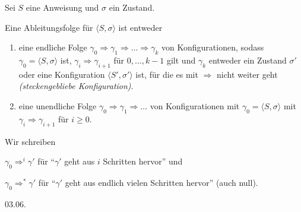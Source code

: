 \begin{definition}
    Sei $S$ eine Anweisung und $\sigma$ ein Zustand.

    Eine Ableitungsfolge für $\langle S, \sigma \rangle$ ist entweder
    \begin{enumerate}
        \item eine endliche Folge $\gamma_0 \Rightarrow \gamma_1 \Rightarrow \dots \Rightarrow \gamma_k$ von Konfigurationen, sodass $\gamma_0 = \langle S, \sigma \rangle$ ist, $\gamma_i \Rightarrow \gamma_{i+1}$ für $0, \dots, k-1$ gilt und $\gamma_k$ entweder ein Zustand $\sigma'$ oder eine Konfiguration $\langle S', \sigma' \rangle$ ist, für die es mit $\Rightarrow$ nicht weiter geht \emph{(steckengebliebe Konfiguration)}.

        \item eine unendliche Folge $\gamma_0 \Rightarrow \gamma_1 \Rightarrow \dots$ von Konfigurationen mit $\gamma_0 = \langle S, \sigma \rangle$ mit $\gamma_i \Rightarrow \gamma_{i+1}$ für $i \geq 0$.
    \end{enumerate}
\end{definition}

\par\medskip
\begin{notation}
    Wir schreiben

    $\gamma_0 \Rightarrow^i \gamma'$ für ``$\gamma'$ geht aus $i$ Schritten hervor'' und

    $\gamma_0 \Rightarrow^* \gamma'$ für ``$\gamma'$ geht aus endlich vielen Schritten hervor'' (auch null).
\end{notation}



\newpage
\hfill 03.06.

